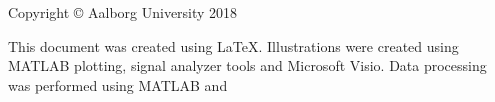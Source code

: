 \thispagestyle{empty}
{\small
\strut\vfill %
\noindent Copyright \copyright{} Aalborg University 2018\par
\vspace{0.2cm}
\noindent This document was created using \LaTeX. Illustrations were created using MATLAB plotting, signal analyzer tools and Microsoft Visio. Data processing was performed using MATLAB and 
}
\clearpage

